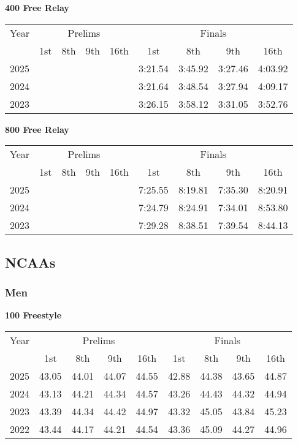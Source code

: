 \textbf{400 Free Relay}

\begin{flushleft}
\begin{tabular}{|c|c|c|c|c|c|c|c|c|}
\hline
Year & \multicolumn{4}{c|}{Prelims} & \multicolumn{4}{c|}{Finals} \\
\cline{2-9}
& 1st & 8th & 9th & 16th & 1st & 8th & 9th & 16th \\
\hline
2025 &  &  &  &  & 3:21.54 & 3:45.92 & 3:27.46 & 4:03.92 \\
2024 &  &  &  &  & 3:21.64 & 3:48.54 & 3:27.94 & 4:09.17 \\
2023 &  &  &  &  & 3:26.15 & 3:58.12 & 3:31.05 & 3:52.76 \\
\hline
\end{tabular}
\end{flushleft}

\textbf{800 Free Relay}

\begin{flushleft}
\begin{tabular}{|c|c|c|c|c|c|c|c|c|}
\hline
Year & \multicolumn{4}{c|}{Prelims} & \multicolumn{4}{c|}{Finals} \\
\cline{2-9}
& 1st & 8th & 9th & 16th & 1st & 8th & 9th & 16th \\
\hline
2025 &  &  &  &  & 7:25.55 & 8:19.81 & 7:35.30 & 8:20.91 \\
2024 &  &  &  &  & 7:24.79 & 8:24.91 & 7:34.01 & 8:53.80 \\
2023 &  &  &  &  & 7:29.28 & 8:38.51 & 7:39.54 & 8:44.13 \\
\hline
\end{tabular}
\end{flushleft}

\subsection{NCAAs}

\subsubsection{Men}

\clearpage
\textbf{100 Freestyle}

\begin{flushleft}
\begin{tabular}{|c|c|c|c|c|c|c|c|c|}
\hline
Year & \multicolumn{4}{c|}{Prelims} & \multicolumn{4}{c|}{Finals} \\
\cline{2-9}
& 1st & 8th & 9th & 16th & 1st & 8th & 9th & 16th \\
\hline
2025 & 43.05 & 44.01 & 44.07 & 44.55 & 42.88 & 44.38 & 43.65 & 44.87 \\
2024 & 43.13 & 44.21 & 44.34 & 44.57 & 43.26 & 44.43 & 44.32 & 44.94 \\
2023 & 43.39 & 44.34 & 44.42 & 44.97 & 43.32 & 45.05 & 43.84 & 45.23 \\
2022 & 43.44 & 44.17 & 44.21 & 44.54 & 43.36 & 45.09 & 44.27 & 44.96 \\
\hline
\end{tabular}
\end{flushleft}

